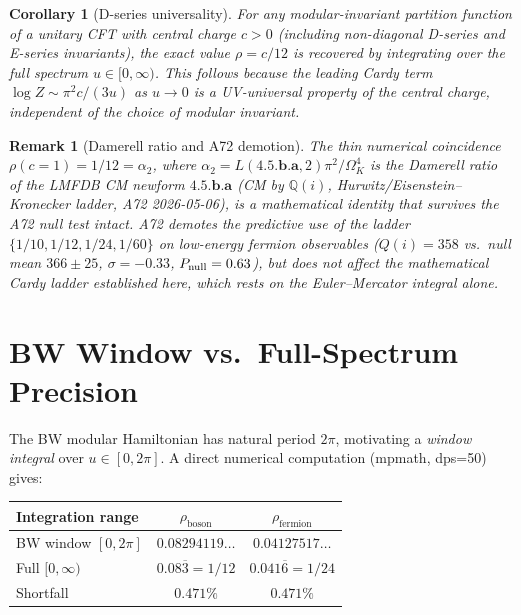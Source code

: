 \documentclass[12pt]{article}
\newtheorem{corollary}[theorem]{Corollary}
\newtheorem{remark}{Remark}
\begin{document}
\begin{corollary}[D-series universality]
\label{cor:dseries}
For any modular-invariant partition function of a unitary CFT with
central charge $c>0$ (including non-diagonal D-series and E-series
invariants), the exact value $\rho = c/12$ is recovered by
integrating over the full spectrum $u\in[0,\infty)$.  This follows
because the leading Cardy term $\log Z \sim \pi^2 c/(3u)$ as $u\to 0$
is a UV-universal property of the central charge, independent of the
choice of modular invariant.
\end{corollary}

\begin{remark}[Damerell ratio and A72 demotion]
\label{rem:damerell-a72}
The thin numerical coincidence $\rho(c=1) = 1/12 = \alpha_2$, where
$\alpha_2 = L(\mathbf{4.5.b.a},2)\pi^2/\Omega_K^4$ is the Damerell ratio
of the LMFDB CM newform $\mathbf{4.5.b.a}$ (CM by $\mathbb{Q}(i)$,
Hurwitz/Eisenstein--Kronecker ladder, A72 2026-05-06), is a
\emph{mathematical} identity that survives the A72 null test intact.
A72 demotes the predictive use of the ladder
$\{1/10,1/12,1/24,1/60\}$ on low-energy fermion observables
($Q(i)=358$ vs.\ null mean $366\pm 25$, $\sigma=-0.33$,
$P_{\rm null}=0.63$), but does \emph{not} affect the mathematical Cardy
ladder established here, which rests on the Euler--Mercator integral
alone.
\end{remark}

\section{BW Window vs.\ Full-Spectrum Precision}

The BW modular Hamiltonian has natural period $2\pi$, motivating
a \emph{window integral} over $u\in[0,2\pi]$.  A direct numerical
computation (mpmath, dps=50) gives:

\begin{center}
\begin{tabular}{lcc}
\toprule
Integration range & $\rho_{\mathrm{boson}}$ & $\rho_{\mathrm{fermion}}$ \\
\midrule
BW window $[0,2\pi]$   & $0.08294119\ldots$ & $0.04127517\ldots$ \\
Full $[0,\infty)$       & $0.08\overline{3} = 1/12$ & $0.041\overline{6} = 1/24$ \\
Shortfall               & $0.471\%$          & $0.471\%$          \\
\bottomrule
\end{tabular}
\end{center}
\end{document}
